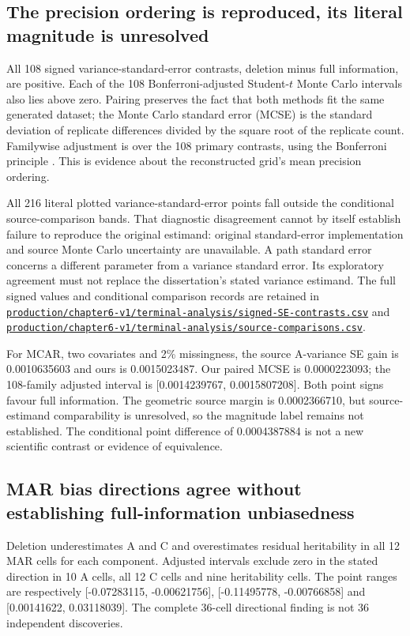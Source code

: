 \documentclass[11pt]{article}
\newcommand{\file}[1]{\href{https://github.com/alectionary/vibe-math/blob/master/formalization/schwabe-psychometric-genetics/#1}{\nolinkurl{#1}}}
\begin{document}
\subsection{The precision ordering is reproduced, its literal magnitude is unresolved}
All 108 signed variance-standard-error contrasts, deletion minus full information, are positive. Each of the 108 Bonferroni-adjusted Student-$t$ Monte Carlo intervals also lies above zero. Pairing preserves the fact that both methods fit the same generated dataset; the Monte Carlo standard error (MCSE) is the standard deviation of replicate differences divided by the square root of the replicate count. Familywise adjustment is over the 108 primary contrasts, using the Bonferroni principle \citep{dunn1961}. This is evidence about the reconstructed grid's mean precision ordering.

All 216 literal plotted variance-standard-error points fall outside the conditional source-comparison bands. That diagnostic disagreement cannot by itself establish failure to reproduce the original estimand: original standard-error implementation and source Monte Carlo uncertainty are unavailable. A path standard error concerns a different parameter from a variance standard error. Its exploratory agreement must not replace the dissertation's stated variance estimand. The full signed values and conditional comparison records are retained in \file{production/chapter6-v1/terminal-analysis/signed-SE-contrasts.csv} and \file{production/chapter6-v1/terminal-analysis/source-comparisons.csv}.

For MCAR, two covariates and 2\% missingness, the source A-variance SE gain is 0.0010635603 and ours is 0.0015023487. Our paired MCSE is 0.0000223093; the 108-family adjusted interval is [0.0014239767, 0.0015807208]. Both point signs favour full information. The geometric source margin is 0.0002366710, but source-estimand comparability is unresolved, so the magnitude label remains not established. The conditional point difference of 0.0004387884 is not a new scientific contrast or evidence of equivalence.

\subsection{MAR bias directions agree without establishing full-information unbiasedness}
Deletion underestimates A and C and overestimates residual heritability in all 12 MAR cells for each component. Adjusted intervals exclude zero in the stated direction in 10 A cells, all 12 C cells and nine heritability cells. The point ranges are respectively [-0.07283115, -0.00621756], [-0.11495778, -0.00766858] and [0.00141622, 0.03118039]. The complete 36-cell directional finding is not 36 independent discoveries.
\end{document}
